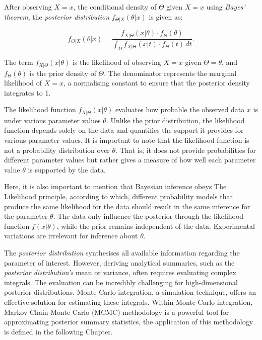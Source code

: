 \documentclass[
  11pt,
]{article}
\begin{document}
After observing \(X = x\), the conditional density of \(\Theta\) given
\(X = x\) using \emph{Bayes' theorem}, the \emph{posterior distribution}
\(f_{\Theta|X}(\theta|x)\) is given as:

\begin{equation}
f_{\Theta|X}(\theta|x) = \frac{f_{X|\Theta}(x|\theta) \cdot f_{\Theta}(\theta)} {\int_{\Omega} f_{X|\Theta}(x|t) \cdot f_{\Theta}(t) \, dt}.
\end{equation}

The term \(f_{X|\Theta}(x|\theta)\) is the likelihood of observing
\(X = x\) given \(\Theta = \theta\), and \(f_{\Theta}(\theta)\) is the
prior density of \(\Theta\). The denominator represents the marginal
likelihood of \(X = x\), a normalising constant to ensure that the
posterior density integrates to 1.

The likelihood function \(f_{X|\Theta}(x|\theta)\) evaluates how
probable the observed data \(x\) is under various parameter values
\(\theta\). Unlike the prior distribution, the likelihood function
depends solely on the data and quantifies the support it provides for
various parameter values. It is important to note that the likelihood
function is not a probability distribution over \(\theta\). That is, it
does not provide probabilities for different parameter values but rather
gives a measure of how well each parameter value \(\theta\) is supported
by the data.

Here, it is also important to mention that Bayesian inference obeys The
Likelihood principle, according to which, different probability models
that produce the same likelihood for the data should result in the same
inference for the parameter \(\theta\). The data only influence the
posterior through the likelihood function \(f(x|\theta)\), while the
prior remains independent of the data. Experimental variations are
irrelevant for inference about \(\theta\).

The \emph{posterior distribution} synthesises all available information
regarding the parameter of interest. However, deriving analytical
summaries, such as the \emph{posterior distribution's} mean or variance,
often requires evaluating complex integrals. The evaluation can be
incredibly challenging for high-dimensional posterior distributions.
Monte Carlo integration, a simulation technique, offers an effective
solution for estimating these integrals. Within Monte Carlo integration,
Markov Chain Monte Carlo (MCMC) methodology is a powerful tool for
approximating posterior summary statistics, the application of this
methodology is defined in the following Chapter.
\end{document}
